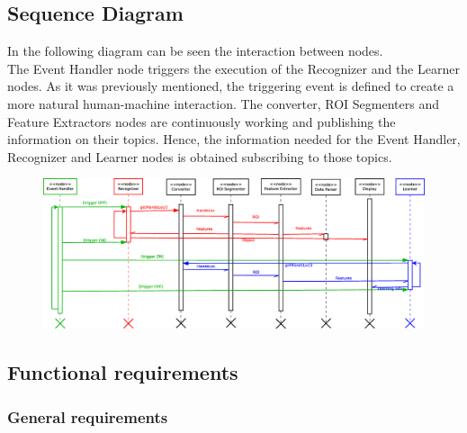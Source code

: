 \subsection{Sequence Diagram}
In the following diagram can be seen the interaction between nodes. \\
The Event Handler node triggers the execution of the Recognizer and the Learner nodes. As it was previously mentioned, the triggering event is defined to create a more natural human-machine interaction.
The converter, ROI Segmenters and Feature Extractors nodes are continuously working and publishing the information on their topics. 
Hence, the information needed for the Event Handler, Recognizer and Learner nodes is obtained subscribing to those topics. 
\begin{figure}[H]
\begin{center}
\includegraphics[width=\textwidth]{img/diagrams/sequence.eps}
\end{center}
\end{figure}






\subsection{Functional requirements}

\subsubsection{General requirements}

